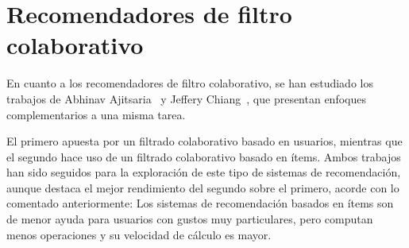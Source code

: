 
\section{Recomendadores de filtro colaborativo}

En cuanto a los recomendadores de filtro colaborativo, se han estudiado los trabajos de Abhinav Ajitsaria~\cite{filtro_colaborativo_1} y Jeffery Chiang~\cite{filtro_colaborativo_2}, que presentan enfoques complementarios a una misma tarea.

El primero apuesta por un filtrado colaborativo basado en usuarios, mientras que el segundo hace uso de un filtrado colaborativo basado en ítems. Ambos trabajos han sido seguidos para la exploración de este tipo de sistemas de recomendación, aunque destaca el mejor rendimiento del segundo sobre el primero, acorde con lo comentado anteriormente: Los sistemas de recomendación basados en ítems son de menor ayuda para usuarios con gustos muy particulares, pero computan menos operaciones y su velocidad de cálculo es mayor.